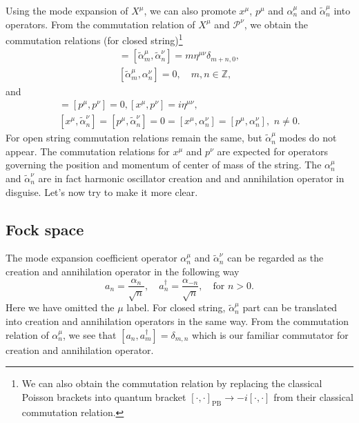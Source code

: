 \documentclass[graybox,envcountchap,sectrefs]{svmono}
\begin{document}
Using the mode expansion of $X^{\mu}$, we can also promote $x^{\mu}$, $p^{\mu}$ and $\alpha^{\mu}_n$ and $\tilde{\alpha}^{\mu}_n$ into operators. From the commutation relation of $X^{\mu}$ and $\mathcal{P}^{\nu}$, we obtain the commutation relations (for closed string)\footnote{We can also obtain the commutation relation by replacing the classical Poisson brackets into quantum bracket $[\cdot,\cdot]_{\mathrm{PB}}\to -i[\cdot,\cdot]$ from their classical commutation relation.}
\begin{align}
[\alpha_{m}^{\mu}, \alpha_{n}^{\nu}]=[\tilde{\alpha}_{m}^{\mu}, \tilde{\alpha}_{n}^{\nu}]=m \eta^{\mu \nu} \delta_{m+n, 0}, \label{eq:qbcoeff1}\\
[\tilde{\alpha}_{m}^{\mu}, \alpha_{n}^{\nu}]=0, \quad m, n \in \mathbb{Z},\label{eq:qbcoeff2}
\end{align}
and
\begin{align}
[x^{\mu}, x^{\nu}]=[p^{\mu}, p^{\nu}]=0,  [x^{\mu}, p^{\nu}]=i\eta^{\mu \nu}, \\
[x^{\mu}, \tilde{\alpha}_{n}^{\nu}]=[p^{\mu}, \tilde{\alpha}_{n}^{\nu}]=0=[x^{\mu}, \alpha_{n}^{\nu}]=[p^{\mu}, \alpha_{n}^{\nu}], \,\, n\neq 0.
\end{align}
For open string commutation relations remain the same, but $\tilde{\alpha}^{\mu}_n$ modes do not appear.
The commutation relations for $x^{\mu}$ and $p^{\nu}$ are expected for operators governing the position and momentum of center of mass of the string. The $\alpha^{\mu}_n$ and $\tilde{\alpha}^{\nu}_n$ are in fact
harmonic oscillator creation and and annihilation operator in disguise. Let's now  try to make it more clear.

\subsection{Fock space}
The mode expansion coefficient operator $\alpha^{\mu}_n$ and $\tilde{\alpha}^{\nu}_n$  can be regarded as the creation and annihilation operator in the following way
\begin{equation}
a_n=\frac{\alpha_{n}}{\sqrt{n}},\quad 	a_n^{\dagger}=\frac{\alpha_{-n}}{\sqrt{n}}, \quad \text{for}\,\, n>0.
\end{equation}
Here we have omitted the $\mu$ label. 
For closed string, $\tilde{\alpha}_n^{\mu}$ part can be translated into creation and annihilation operators in the same way. 
From the commutation relation of $\alpha_n^{\mu}$, we see that $[a_n,a^{\dagger}_m]=\delta_{m,n}$ which is our familiar commutator for creation and annihilation operator.
\end{document}
